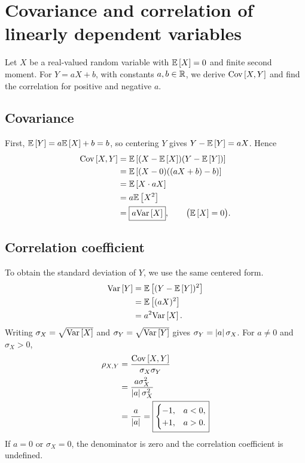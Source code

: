 \section{Covariance and correlation of linearly dependent variables}

Let \(X\) be a real-valued random variable with \(\mathbb{E}\left[X\right]=0\)
and finite second moment. For \(Y=aX+b\), with constants \(a,b\in\mathbb{R}\),
we derive \(\mathrm{Cov}\left[X,Y\right]\) and find the correlation for
positive and negative \(a\).

\subsection*{Covariance}

First, \(\mathbb{E}\left[Y\right]=a\mathbb{E}\left[X\right]+b=b\), so centering \(Y\) gives
\(Y-\mathbb{E}\left[Y\right]=aX\). Hence
\begin{align*}
  \mathrm{Cov}\left[X,Y\right]
  &= \mathbb{E}\left[(X-\mathbb{E}\left[X\right])(Y-\mathbb{E}\left[Y\right])\right] \\
  &= \mathbb{E}\left[(X-0)((aX+b)-b)\right] \\
  &= \mathbb{E}\left[X\cdot aX\right] \\
  &= a\mathbb{E}\left[X^2\right] \\
  &= \boxed{a\mathrm{Var}\left[X\right]}, \qquad \bigl(\mathbb{E}\left[X\right]=0\bigr).
\end{align*}

\subsection*{Correlation coefficient}

To obtain the standard deviation of \(Y\), we use the same centered form.
\begin{align*}
  \mathrm{Var}\left[Y\right]
  &= \mathbb{E}\left[(Y-\mathbb{E}\left[Y\right])^2\right] \\
  &= \mathbb{E}\left[(aX)^2\right] \\
  &= a^2\mathrm{Var}\left[X\right].
\end{align*}
Writing \(\sigma_X=\sqrt{\mathrm{Var}\left[X\right]}\) and
\(\sigma_Y=\sqrt{\mathrm{Var}\left[Y\right]}\) gives
\(\sigma_Y=\left|a\right|\sigma_X\). For \(a\ne 0\) and \(\sigma_X>0\),
\begin{align*}
  \rho_{X,Y}
  &= \frac{\mathrm{Cov}\left[X,Y\right]}{\sigma_X\sigma_Y} \\
  &= \frac{a\sigma_X^2}{\left|a\right|\sigma_X^2} \\
  &= \frac{a}{\left|a\right|} = \boxed{\begin{cases} -1, & a<0, \\ +1, & a>0. \end{cases}}
\end{align*}
If \(a=0\) or \(\sigma_X=0\), the denominator is zero and the
correlation coefficient is undefined.
